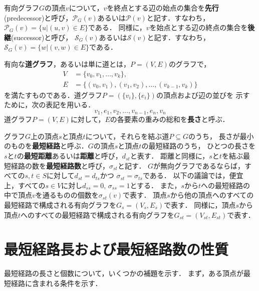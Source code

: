 有向グラフ$G$の頂点$v$について，$v$を終点とする辺の始点の集合を\textbf{先行}
(predecessor)と呼び，$\mathcal{P}_G(v)$あるいは$\mathcal{P}(v)$と記す．すなわち，
$\mathcal{P}_G(v)=\{u|(u,v)\in E\}$である．
同様に，$v$を始点とする辺の終点の集合を\textbf{後継}(successor)と呼び，
$\mathcal{S}_G(v)$あるいは$\mathcal{S}(v)$と記す．すなわち，$\mathcal{S}_G(v)=\{w|(v,w)\in E\}$である．

有向な\textbf{道グラフ}，あるいは単に道とは，$P=(V,E)$のグラフで，
\begin{equation*}
  \begin{aligned}
  V&=\{v_0,v_1,\ldots,v_k\}, \\
  E&=\{(v_0,v_1),(v_1,v_2),\ldots,(v_{k-1},v_k)\}
  \end{aligned}
\end{equation*}
を満たすものである．道グラフ$P=(\{v_i\},\{e_i\})$の頂点および辺の並びを
示すために，次の表記を用いる．
\[ v_1,e_1,v_2,\ldots,v_{n-1},e_n,v_n \]
道グラフ$P=(V,E)$に対して，$E$の各要素の重みの総和を\textbf{長さ}と呼ぶ．

グラフ$G$上の頂点$s$と頂点$t$について，それらを結ぶ道$P\subseteq G$のうち，
長さが最小のものを\textbf{最短経路}と呼ぶ．$G$の頂点$s$と頂点$t$の最短経路のうち，
ひとつの長さを$s$と$t$の\textbf{最短距離}あるいは\textbf{距離}と呼び，$d_{st}$と表す．
距離と同様に，$s$と$t$を結ぶ最短経路の数を\textbf{最短経路数}と呼び，$\sigma_{st}$と記す．
$G$が無向グラフであるならば，すべての$s,t\in S$に対して$d_{st}=d_{ts}$かつ
$\sigma_{st}=\sigma_{ts}$である．
以下の議論では，便宜上，すべての$s\in V$に対し$d_{ss}=0$, $\sigma_{ss}=1$とする．
また，$s$から$t$への最短経路の中で頂点$v$を通るものの個数を$\sigma_{st}(v)$で表す．
頂点$s$から他の頂点へのすべての最短経路で構成される有向グラフを$G_s=(V_s,E_s)$で表す．
同様に，頂点$s$から頂点$t$へのすべての最短経路で構成される有向グラフを$G_{st}=(V_{st},E_{st})$で表す．

\section{最短経路長および最短経路数の性質}
\label{sect:shortest-paths}

最短経路の長さと個数について，いくつかの補題を示す．
まず，ある頂点が最短経路に含まれる条件を示す．

